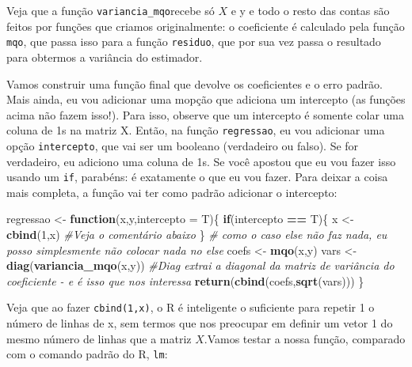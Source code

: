 \documentclass[]{book}
\newenvironment{Shaded}{\begin{snugshade}}{\end{snugshade}}
\newcommand{\KeywordTok}[1]{\textcolor[rgb]{0.13,0.29,0.53}{\textbf{#1}}}
\newcommand{\DataTypeTok}[1]{\textcolor[rgb]{0.13,0.29,0.53}{#1}}
\newcommand{\DecValTok}[1]{\textcolor[rgb]{0.00,0.00,0.81}{#1}}
\newcommand{\FloatTok}[1]{\textcolor[rgb]{0.00,0.00,0.81}{#1}}
\newcommand{\StringTok}[1]{\textcolor[rgb]{0.31,0.60,0.02}{#1}}
\newcommand{\CommentTok}[1]{\textcolor[rgb]{0.56,0.35,0.01}{\textit{#1}}}
\newcommand{\ControlFlowTok}[1]{\textcolor[rgb]{0.13,0.29,0.53}{\textbf{#1}}}
\newcommand{\OperatorTok}[1]{\textcolor[rgb]{0.81,0.36,0.00}{\textbf{#1}}}
\newcommand{\NormalTok}[1]{#1}
\begin{document}
Veja que a função \texttt{variancia\_mqo}recebe só \(X\) e y e todo o
resto das contas são feitos por funções que criamos originalmente: o
coeficiente é calculado pela função \texttt{mqo}, que passa isso para a
função \texttt{residuo}, que por sua vez passa o resultado para obtermos
a variância do estimador.

Vamos construir uma função final que devolve os coeficientes e o erro
padrão. Mais ainda, eu vou adicionar uma mopção que adiciona um
intercepto (as funções acima não fazem isso!). Para isso, observe que um
intercepto é somente colar uma coluna de 1s na matriz X. Então, na
função \texttt{regressao}, eu vou adicionar uma opção
\texttt{intercepto}, que vai ser um booleano (verdadeiro ou falso). Se
for verdadeiro, eu adiciono uma coluna de 1s. Se você apostou que eu vou
fazer isso usando um \texttt{if}, parabéns: é exatamente o que eu vou
fazer. Para deixar a coisa mais completa, a função vai ter como padrão
adicionar o intercepto:

\begin{Shaded}
\begin{Highlighting}[]
\NormalTok{regressao <-}\StringTok{ }\ControlFlowTok{function}\NormalTok{(x,y,}\DataTypeTok{intercepto =}\NormalTok{ T)\{}
  \ControlFlowTok{if}\NormalTok{(intercepto }\OperatorTok{==}\StringTok{ }\NormalTok{T)\{}
\NormalTok{    x <-}\StringTok{ }\KeywordTok{cbind}\NormalTok{(}\DecValTok{1}\NormalTok{,x) }\CommentTok{#Veja o comentário abaixo}
\NormalTok{  \} }\CommentTok{# como o caso else não faz nada, eu posso simplesmente não colocar nada no else}
\NormalTok{  coefs <-}\StringTok{ }\KeywordTok{mqo}\NormalTok{(x,y)}
\NormalTok{  vars <-}\StringTok{ }\KeywordTok{diag}\NormalTok{(}\KeywordTok{variancia_mqo}\NormalTok{(x,y)) }\CommentTok{#Diag extrai a diagonal da matriz de variância do coeficiente - e é isso que nos interessa}
  \KeywordTok{return}\NormalTok{(}\KeywordTok{cbind}\NormalTok{(coefs,}\KeywordTok{sqrt}\NormalTok{(vars)))}
\NormalTok{\}}
\end{Highlighting}
\end{Shaded}

Veja que ao fazer \texttt{cbind(1,x)}, o R é inteligente o suficiente
para repetir 1 o número de linhas de x, sem termos que nos preocupar em
definir um vetor 1 do mesmo número de linhas que a matriz \(X\).Vamos
testar a nossa função, comparado com o comando padrão do R, \texttt{lm}:

\begin{Shaded}
\end{Shaded}
\end{document}
